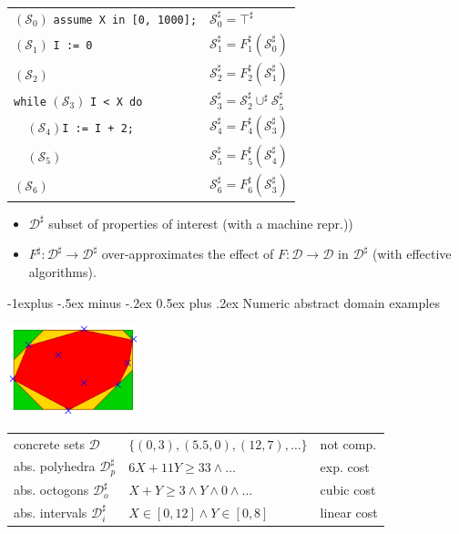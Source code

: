 \documentclass[10pt,landscape]{article}
\makeatletter
\renewcommand{\subsection}{\@startsection{subsection}{2}{0mm}%
                                {-1explus -.5ex minus -.2ex}%
                                {0.5ex plus .2ex}%
                                {\normalfont\normalsize\bfseries}}
\makeatother
\begin{document}
\begin{multicols}{3}
\begin{tabular}{@{}ll@{}}
$(\mathcal{S}_0)$ \verb!assume X in [0, 1000];! & $\mathcal{S}_0^{\sharp} = \top^{\sharp}$\\
$(\mathcal{S}_1)$ \verb!I := 0!  & $\mathcal{S}_1^{\sharp} = F_1^{\sharp} (\mathcal{S}_0^{\sharp})$\\
$(\mathcal{S}_2)$ & $\mathcal{S}_2^{\sharp} = F_2^{\sharp} (\mathcal{S}_1^{\sharp})$\\
\verb!while! $(\mathcal{S}_3)$ \verb!I < X do! & $\mathcal{S}_3^{\sharp} = \mathcal{S}_2^{\sharp} \cup^{\sharp} \mathcal{S}_5^{\sharp}$\\
\verb!  !$(\mathcal{S}_4)$\verb!I := I + 2;!  & $\mathcal{S}_4^{\sharp} = F_4^{\sharp} (\mathcal{S}_3^{\sharp})$ \\
\verb!  !$(\mathcal{S}_5)$ & $\mathcal{S}_5^{\sharp} = F_5^{\sharp} (\mathcal{S}_4^{\sharp})$\\
$(\mathcal{S}_6)$ & $\mathcal{S}_6^{\sharp} = F_6^{\sharp} (\mathcal{S}_3^{\sharp})$
\end{tabular}

\begin{itemize}\setlength{\itemsep}{-0.7mm}
\item $\mathcal{D}^{\sharp}$ subset of properties of interest (with a machine repr.))
\item $F^{\sharp} : \mathcal{D}^{\sharp} \rightarrow \mathcal{D}^{\sharp}$ over-approximates the effect of $F : \mathcal{D} \rightarrow \mathcal{D}$ in $\mathcal{D}^{\sharp}$ (with effective algorithms).
\end{itemize}

\subsection{Numeric abstract domain examples}

\begin{center}
  \includegraphics[height=100px]{figures/numerical_domains_examples.png}
\end{center}

\begin{tabular}{@{}lll@{}}
concrete sets $\mathcal{D}$           & $\{ (0, 3), (5.5, 0), (12, 7), \dots\}$       & not comp.\\
abs. polyhedra $\mathcal{D}^{\sharp}_p$ & $6X + 11Y \geq 33 \wedge \dots$               & exp. cost\\
abs. octogons $\mathcal{D}^{\sharp}_o$  & $X + Y \geq 3 \wedge Y \wedge 0 \wedge \dots$ & cubic cost\\
abs. intervals $\mathcal{D}^{\sharp}_i$ & $X \in [0, 12] \wedge Y \in [0, 8]$           & linear cost
\end{tabular}


\end{multicols}
\end{document}
